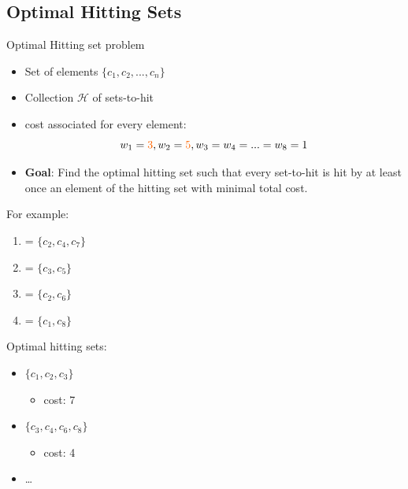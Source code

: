 \documentclass{beamer}
\newcommand\m[1]{\ensuremath{\mathcal{#1}}\xspace}
\renewcommand\emph[1]{{\color{vuborange}#1}}
\begin{document}
			\subsection{Optimal Hitting Sets}
				
				\begin{frame}{\emph{Optimal} Hitting set problem}
					\begin{itemize}
						\item Set of elements $\{c_1,c_2,...,c_n\}$
						\item Collection $\m{H}$ of sets-to-hit\pause
						\item cost associated for every element:
						\[ w_1 =  \emph{3}, w_2= \emph{5}, w_3 = w_4 = ...= w_8 = 1\]\pause
						\item \textbf{Goal}: Find the \emph{optimal} hitting set such that every set-to-hit is hit by at least once an element of the hitting set with \emph{minimal total cost}.
					\end{itemize} \pause
					\vfill
					\begin{minipage}{0.48\textwidth}
						For example: 
						\begin{enumerate}
							\item[$H_1$] = $\{c_2, c_4, c_7\}$
							\item[$H_2$] = $\{c_3, c_5\}$
							\item[$H_3$] = $\{c_2, c_6\}$
							\item[$H_4$] = $\{c_1, c_8\}$
						\end{enumerate}
					\end{minipage}
					\begin{minipage}{0.48\textwidth}
						Optimal hitting sets:
						\begin{itemize}
							\item \st{$\{c_1, c_2, c_3\}$}
							\begin{itemize}
								\item cost: \emph{7}
							\end{itemize}
							\item $\{c_3, c_4, c_6, c_8\}$ \emph{\checkmark}
							\begin{itemize}
								\item cost: \emph{4}
							\end{itemize}
							\item \dots
						\end{itemize}
					\end{minipage}
				\end{frame}
			
\end{document}
